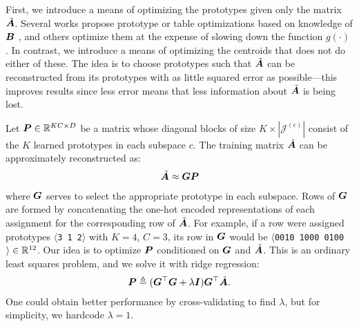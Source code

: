 First, we introduce a means of optimizing the prototypes given only the matrix $\tilde{\bm{A}}$. Several works propose prototype or table optimizations based on knowledge of $\bm{B}$ \cite{pairq,optimizedDists}, and others optimize them at the expense of slowing down the function $g(\cdot)$ \cite{cq,scq}. In contrast, we introduce a means of optimizing the centroids that does not do either of these. The idea is to choose prototypes such that $\tilde{\bm{A}}$ can be reconstructed from its prototypes with as little squared error as possible---this improves results since less error means that less information about $\tilde{\bm{A}}$ is being lost.

Let $\bm{P} \in \mathbb{R}^{KC \times D}$ be a matrix whose diagonal blocks of size $K \times |\mathcal{J}^{(c)}|$ consist of the $K$ learned prototypes in each subspace $c$. The training matrix $\tilde{\bm{A}}$ can be approximately reconstructed as:
\begin{align}
    \tilde{\bm{A}} \approx \bm{G}\bm{P}
\end{align}
where $\bm{G}$ serves to select the appropriate prototype in each subspace. Rows of $\bm{G}$ are formed by concatenating the one-hot encoded representations of each assignment for the corresponding row of $\tilde{\bm{A}}$. For example, if a row were assigned prototypes $\langle$\texttt{3 1 2}$\rangle$ with $K = 4$, $C = 3$, its row in $\bm{G}$ would be $\langle$\texttt{0010 1000 0100}$\rangle \in \mathbb{R}^{12}$. Our idea is to optimize $\bm{P}$ conditioned on $\bm{G}$ and $\tilde{\bm{A}}$. This is an ordinary least squares problem, and we solve it with ridge regression:
\begin{align}
\vspace*{-1mm}
    \mat{P} \triangleq (\mat{G}^\top \mat{G} + \lambda \mat{I}) \mat{G}^\top \tilde{\A}.
\end{align}
One could obtain better performance by cross-validating to find $\lambda$, but for simplicity, we hardcode $\lambda = 1$. %

